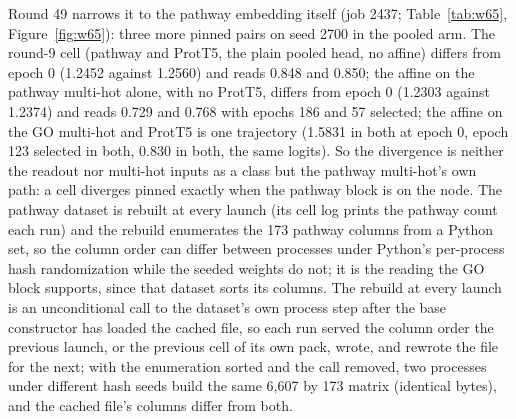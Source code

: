 


Round 49 narrows it to the pathway embedding itself (job 2437; Table~\ref{tab:w65},
Figure~\ref{fig:w65}): three more pinned pairs on seed 2700 in the pooled arm. The
round-9 cell (pathway and ProtT5, the plain pooled head, no affine) differs from epoch
0 (1.2452 against 1.2560) and reads 0.848 and 0.850; the affine on the pathway
multi-hot alone, with no ProtT5, differs from epoch 0 (1.2303 against 1.2374) and reads
0.729 and 0.768 with epochs 186 and 57 selected; the affine on the GO multi-hot and
ProtT5 is one trajectory (1.5831 in both at epoch 0, epoch 123 selected in both, 0.830
in both, the same logits). So the divergence is neither the readout nor multi-hot
inputs as a class but the pathway multi-hot's own path: a cell diverges pinned exactly
when the pathway block is on the node. The pathway dataset is rebuilt at every launch
(its cell log prints the pathway count each run) and the rebuild enumerates the 173
pathway columns from a Python set, so the column order can differ between processes
under Python's per-process hash randomization while the seeded weights do not;
it is the reading the GO block supports, since that dataset sorts its columns. The
rebuild at every launch is an unconditional call to the dataset's own process step
after the base constructor has loaded the cached file, so each run served the column
order the previous launch, or the previous cell of its own pack, wrote, and rewrote
the file for the next; with the enumeration sorted and the call removed, two
processes under different hash seeds build the same 6,607 by 173 matrix (identical
bytes), and the cached file's columns differ from both.

